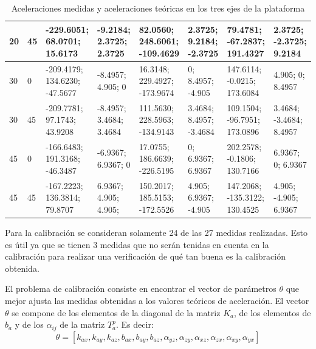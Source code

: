 \documentclass[main]{subfiles}
\begin{document}
\begin{table}[H]
\begin{tiny}
\begin{tabular}{p{30pt}p{30pt}|p{40pt}|p{26pt}|p{40pt}|p{26pt}|p{40pt}|p{26pt}|}
\multicolumn{1}{|p{30pt}|}{20} & 45 &   -229.6051;     68.0701;    15.6173 & -9.2184;    2.3725;    2.3725 & 82.0560;       248.6061;     -109.4629 & 2.3725;    9.2184;    -2.3725 & 79.4781;    -67.2837;     191.4327 & 2.3725;    -2.3725;	9.2184    \\ \hline
\multicolumn{1}{|p{30pt}|}{30} & 0  &  -209.4179;    134.6230;    -47.5677 &       -8.4957;     4.905;    0 & 16.3148;    229.4927;     -173.9674 & 0;		8.4957;		-4.905 & 147.6114;    -0.0215;    173.6084 &  4.905;    0;	8.4957\\ \hline
\multicolumn{1}{|p{30pt}|}{30} & 45 & -209.7781;    97.1743;    43.9208 & -8.4957;    3.4684;    3.4684 & 111.5630;       228.5963;     -134.9143 & 3.4684;    8.4957;	-3.4684 & 109.1504;       -96.7951;     173.0896 & 3.4684;    -3.4684;    8.4957\\ \hline
\multicolumn{1}{|p{30pt}|}{45} & 0  &  -166.6483;    191.3168;    -46.3487 &       -6.9367;    6.9367;    0 & 17.0755;      186.6639;      -226.5195 & 0;          6.9367;    6.9367 & 202.2578;    -0.1806;    130.7166 & 6.9367;    0;         6.9367\\ \hline
\multicolumn{1}{|p{30pt}|}{45} & 45 & -167.2223;    136.3814;    79.8707 &  6.9367;	4.905;     4.905;     & 150.2017;       185.5153;     -172.5526 & 4.905;    6.9367; -4.905      & 147.2068;    -135.3122;     130.4525 &  4.905;    -4.905;	6.9367     \\ \hline


\end{tabular}
\caption{Aceleraciones medidas y aceleraciones teóricas en los tres ejes de la plataforma}
\label{tab:acc}
\end{tiny}
\end{table} 

Para la calibración se consideran solamente 24 de las 27 medidas realizadas. Esto es útil ya que se tienen 3 medidas que no serán tenidas en cuenta en la calibración para realizar una verificación de qué tan buena es la calibración obtenida.

El problema de calibración consiste en encontrar el vector de parámetros $\theta$ que mejor ajusta las medidas obtenidas a los valores teóricos de aceleración. El vector $\theta$ se compone de los elementos de la diagonal de la matriz $K_a$, de los elementos de $b_a$ y de los $\alpha_{ij}$ de la matriz $T_a^p$. Es decir: $$\theta =\left[ k_{ax} , k_{ay} , k_{az} ,b_{ax} ,b_{ay} ,b_{az}, \alpha_{yz} , \alpha_{zy} , \alpha_{xz} , \alpha_{zx} , \alpha_{xy} , \alpha_{yx} \right]$$
\end{document}
